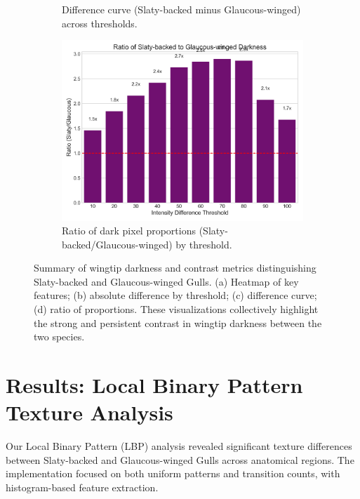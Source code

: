 \documentclass[a4paper,12pt]{report}
\begin{document}
\begin{figure}[H]
\begin{subfigure}[b]{0.48\textwidth}
        \caption{Difference curve (Slaty-backed minus Glaucous-winged) across thresholds.}
        \label{fig:diff_curve}
    \end{subfigure}
    \hfill
    \begin{subfigure}[b]{0.48\textwidth}
        \centering
        \includegraphics[width=\textwidth]{images/REPORT_IMAGES_INTENSITY/I1/ratiogwgsbgdarkness.png}
        \caption{Ratio of dark pixel proportions (Slaty-backed/Glaucous-winged) by threshold.}
        \label{fig:ratio_plot}
    \end{subfigure}
    \caption{Summary of wingtip darkness and contrast metrics distinguishing Slaty-backed and Glaucous-winged Gulls. (a) Heatmap of key features; (b) absolute difference by threshold; (c) difference curve; (d) ratio of proportions. These visualizations collectively highlight the strong and persistent contrast in wingtip darkness between the two species.}
    \label{fig:wingtip_darkness_summary}
\end{figure}

\section{Results: Local Binary Pattern Texture Analysis}
\label{sec:lbp_results}

Our Local Binary Pattern (LBP) analysis revealed significant texture differences between Slaty-backed and Glaucous-winged Gulls across anatomical regions. The implementation focused on both uniform patterns and transition counts, with histogram-based feature extraction.
\end{document}
